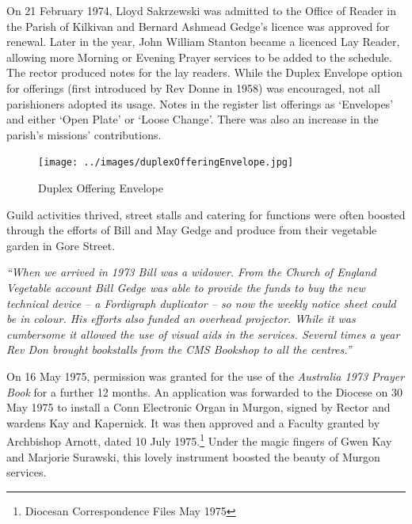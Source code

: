 On 21 February 1974, Lloyd Sakrzewski was admitted to the Office of Reader in the Parish of Kilkivan and Bernard Ashmead Gedge's licence was approved for renewal. Later in the year, John William Stanton became a licenced Lay Reader, allowing more Morning or Evening Prayer services to be added to the schedule. The rector produced notes for the lay readers. While the Duplex Envelope option for offerings (first introduced by Rev Donne in 1958) was encouraged, not all parishioners adopted its usage. Notes in the register list offerings as `Envelopes' and either `Open Plate' or `Loose Change'. There was also an increase in the parish's missions' contributions.









\begin{figure}
\begin{center}
\texttt{[image: ../images/duplexOfferingEnvelope.jpg]}
\caption{Duplex Offering Envelope}
\end{center}
\end{figure}




Guild activities thrived, street stalls and catering for functions were often boosted through the efforts of Bill and May Gedge and produce from their vegetable garden in Gore Street.



\emph{``When we arrived in 1973 Bill was a widower. From the Church of England Vegetable account Bill Gedge was able to provide the funds to buy the new technical device -- a Fordigraph duplicator -- so now the weekly notice sheet could be in colour. His efforts also funded an overhead projector. While it was cumbersome it allowed the use of visual aids in the services. Several times a year Rev Don brought bookstalls from the CMS Bookshop to all the centres.''}



On 16 May 1975, permission was granted for the use of the \emph{Australia 1973 Prayer Book} for a further 12 months. An application was forwarded to the Diocese on 30 May 1975 to install a Conn Electronic Organ in Murgon, signed by Rector and wardens Kay and Kapernick. It was then approved and a Faculty granted by Archbishop Arnott, dated 10 July 1975.\footnote{Diocesan Correspondence Files May 1975} Under the magic fingers of Gwen Kay and Marjorie Surawski, this lovely instrument boosted the beauty of Murgon services.


